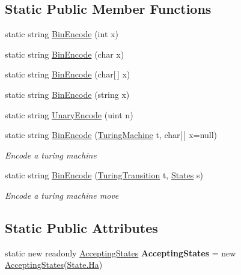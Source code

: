 \subsection*{Static Public Member Functions}
\begin{DoxyCompactItemize}
\item 
static string \mbox{\hyperlink{class_system_1_1_automata_1_1_turing_machine_a91f5ff324232a1377aa280bc7649acb5}{Bin\+Encode}} (int x)
\item 
static string \mbox{\hyperlink{class_system_1_1_automata_1_1_turing_machine_a256b8d185c89a85dc7c27b02e8f61684}{Bin\+Encode}} (char x)
\item 
static string \mbox{\hyperlink{class_system_1_1_automata_1_1_turing_machine_a9f6c774477e3ed6600244bb0ffbe1579}{Bin\+Encode}} (char\mbox{[}$\,$\mbox{]} x)
\item 
static string \mbox{\hyperlink{class_system_1_1_automata_1_1_turing_machine_a559b0d5709eab0bd072c9ae1da449cf4}{Bin\+Encode}} (string x)
\item 
static string \mbox{\hyperlink{class_system_1_1_automata_1_1_turing_machine_ad62c28bec4c48435a98b4eb5edb89487}{Unary\+Encode}} (uint n)
\item 
static string \mbox{\hyperlink{class_system_1_1_automata_1_1_turing_machine_a46274b3df870b1f350b8067e4eda77d9}{Bin\+Encode}} (\mbox{\hyperlink{class_system_1_1_automata_1_1_turing_machine}{Turing\+Machine}} t, char\mbox{[}$\,$\mbox{]} x=null)
\begin{DoxyCompactList}\small\item\em Encode a turing machine \end{DoxyCompactList}\item 
static string \mbox{\hyperlink{class_system_1_1_automata_1_1_turing_machine_ae14f5c2439f706832f06cfc712e27b93}{Bin\+Encode}} (\mbox{\hyperlink{class_system_1_1_automata_1_1_turing_transition}{Turing\+Transition}} t, \mbox{\hyperlink{class_system_1_1_automata_1_1_states}{States}} s)
\begin{DoxyCompactList}\small\item\em Encode a turing machine move \end{DoxyCompactList}\end{DoxyCompactItemize}
\subsection*{Static Public Attributes}
\begin{DoxyCompactItemize}
\item 
\mbox{\label{class_system_1_1_automata_1_1_turing_machine_a95b030005a20801b27d0ec17aa017766}} 
static new readonly \mbox{\hyperlink{class_system_1_1_automata_1_1_accepting_states}{Accepting\+States}} {\bfseries Accepting\+States} = new \mbox{\hyperlink{class_system_1_1_automata_1_1_accepting_states}{Accepting\+States}}(\mbox{\hyperlink{class_system_1_1_automata_1_1_state_ae6639cebabe973cfa8825fedbc4ae741}{State.\+Ha}})
\end{DoxyCompactItemize}
